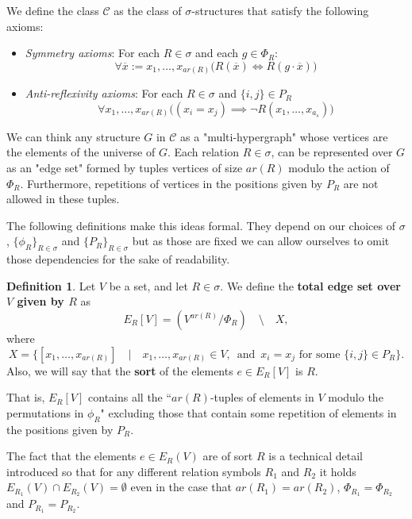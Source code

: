 \documentclass[12pt,notitlepage,a4paper]{article}
\theoremstyle{definition}
\newtheorem{definition}{Definition}[section]
\begin{document}
We define the class $\mathcal{C}$ as the 
class of $\sigma$-structures that
satisfy the 
following axioms: 
\begin{itemize}
	\item \textit{Symmetry axioms}: For each $R\in \sigma$ and
	each $g\in \Phi_R$:
	\[ \forall \overline{x}:=x_1,\dots, x_{ar(R)} \big(  R(\overline{x})
	\iff R(g\cdot\overline{x}) \big)    \]
	\item \textit{Anti-reflexivity axioms}: For each 
	$R\in \sigma$ and $\{i,j\}\in P_R$
	\[ \forall x_1,\dots, x_{ar(R)} 
	\big( (x_i=x_j) \implies \neg R(x_1,\dots, x_{a_s})
	\big)\]
	\end{itemize}

We can think any structure $G$ in $\mathcal{C}$
as a "multi-hypergraph" whose vertices are the elements
of the universe of $G$. Each relation $R\in \sigma$, can be 
represented over $G$ as an "edge set" formed by tuples vertices
of size $ar(R)$ modulo the action of $\Phi_R$. Furthermore, 
repetitions of vertices in the positions given by
$P_R$ are not allowed in these tuples.\par
The following definitions make this ideas formal. They 
depend on our choices of $\sigma$, $\{\phi_R\}_{R\in \sigma}$
and $\{P_R\}_{R\in \sigma}$ but as those are fixed we can
allow ourselves to omit those dependencies for the sake of readability. 

\begin{definition} 
	Let $V$ be a set, and let $R\in \sigma$.
	We define the \textbf{total edge set over $V$
	given by $R$} as
	\[ E_R[V]= (V^{ar(R)}/\Phi_R) \quad \setminus 
	\quad X, \]
	where
	\[
	X=
	\Big\{ [x_1,\dots,x_{ar(R)}]  
	\quad \Big| \quad
	x_1,\dots,x_{ar(R)}\in V, \,
	\text{ and } 
	 \, x_i=x_j \text{ for some } 
	\{i,j\}\in P_R \Big\}.
	\]
	Also, we will say that the \textbf{sort} of the elements $e\in E_R[V]$
	is $R$. 
\end{definition}

That is, $E_R[V]$ contains all the ``$ar(R)$-tuples of elements
in $V$ modulo the permutations
in $\phi_R$" 
excluding those that contain some repetition of elements in
the positions given by $P_R$.\par
The fact that the elements $e\in E_R(V)$ are of sort $R$ 
is a technical detail
introduced so that for any different relation symbols $R_1$ and
$R_2$ it holds $E_{R_1}(V)\cap E_{R_2}(V)=\emptyset$ even in the case
that $ar(R_1)=ar(R_2)$, $\Phi_{R_1}=\Phi_{R_2}$ and $P_{R_1}=P_{R_2}$.\par
\end{document}
